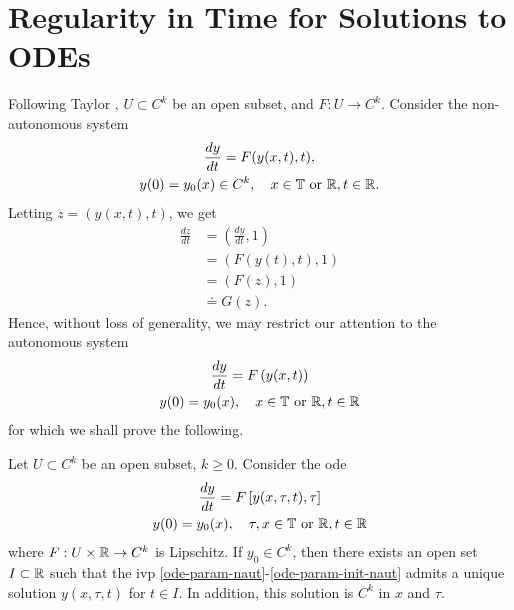 \section{Regularity in Time for Solutions to ODEs} 
\label{sec:dep-param}
%
%
Following Taylor \cite{Taylor:1995kx}, $U \subset C^{k}$ be an open subset, and
$F: U \to C^{k}$. Consider the non-autonomous system
%
%
\begin{gather}
  \label{aa}
\frac{dy}{dt} = F(y(x,t), t),
\\
y(0)= y_{0}(x) \in C^{k}, \quad x \in \mathbb{T} \ \text{or} \ \mathbb{R},t \in \mathbb{R}.
\label{bb}
\end{gather}
%
Letting $z = (y(x,t), t)$, we get
%
%
\begin{equation*}
\begin{split}
\frac{dz}{dt}  
& = \left (\frac{dy}{dt}, 1 \right )
\\
& = \left( F(y(t), t), 1 \right)
\\
& = \left( F(z), 1 \right)
\\
& \doteq G(z).
\end{split}
\end{equation*}
%
%
Hence, without loss of generality, we may restrict our attention to the
autonomous system
%
%
\begin{gather}
\frac{dy}{dt} = F\left( y(x,t) \right)
\label{ode-eq}
\\
y(0) = y_{0}(x), \quad x \in \mathbb{T} \ \text{or} \ \mathbb{R},t \in \mathbb{R}
\label{ode-init-data}
\end{gather}
%
%
%
for which we shall prove the following.
%
%
%
%
%
%
%
%
%
\begin{corollary}
  \label{cor:reg-param}
  Let $U \subset C^{k}$ be an open subset, $ k \ge 0$.  
Consider the ode
\begin{gather}
  \label{ode-param-naut}
\frac{dy}{dt} = F \left [ y(x, \tau, t), \tau \right]
\\
y(0) = y_{0}(x), \quad \tau, x \in \mathbb{T} \ \text{or} \ \mathbb{R}, t \in \mathbb{R}
\label{ode-param-init-naut}
\end{gather}
%
%
where $F: U \times \mathbb{R}  \to C^{k}$ is Lipschitz. If $y_{0} \in C^{k}$, then
there exists an 
open set $I \subset \mathbb{R}$
such that the ivp \eqref{ode-param-naut}-\eqref{ode-param-init-naut}
admits a unique solution $y(x, \tau, t)$ for $t \in I$. In addition,
this solution is $C^{k}$ in $x$ and $\tau$.
%
\end{corollary}
